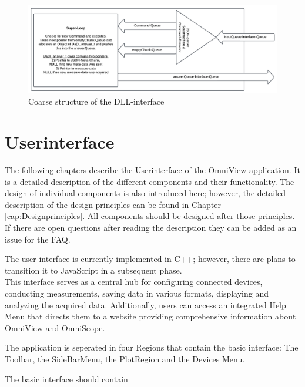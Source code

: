 \documentclass{scrreprt}
\begin{document}
\begin{figure}
    \includegraphics[width=.9\textwidth]{./assets/pictures/interface.pdf}
    \caption[]{Coarse structure of the DLL-interface}
    \label{fig:dllinterface}
\end{figure}




\section{Userinterface}

The following chapters describe the Userinterface of the OmniView application. It is a detailed description of the different components and their functionality.
The design of individual components is also introduced here; however, the detailed description of the design principles can be found in Chapter \ref{cap:Designprinciples}. 
All components should be designed after those principles.\\
If there are open questions after reading the description they can be added as an issue for the FAQ. 

The user interface is currently implemented in C++; however, there are plans to transition it to JavaScript in a subsequent phase.\\
This interface serves as a central hub for configuring connected devices, conducting measurements, saving data in various formats, 
displaying and analyzing the acquired data. Additionally, users can access an integrated Help Menu that directs them to a website providing comprehensive information about OmniView and OmniScope.


The application is seperated in four Regions that contain the basic interface: The Toolbar, the SideBarMenu, the PlotRegion and the Devices Menu.

The basic interface should contain 
\end{document}
